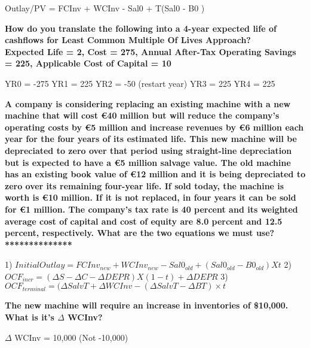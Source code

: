 \documentclass[12pt]{article}
\begin{document}
\begin{framed}
{			Outlay/PV = FCInv + WCInv - Sal0 + T(Sal0 - B0	)
			
			
			\textbf{How do you translate the following into a 4-year expected life of cashflows for Least Common Multiple Of Lives Approach?\\
				Expected Life = 2, Cost = 275, Annual After-Tax Operating Savings = 225, Applicable Cost of Capital = 10}
			
			YR0 = -275
			YR1 = 225
			YR2 = -50 (restart year)
			YR3 = 225
			YR4 = 225
			
			\textbf{A company is considering replacing an existing machine with a new machine that will cost €40 million but will reduce the company's operating costs by €5 million and increase revenues by €6 million each year for the four years of its estimated life. This new machine will be depreciated to zero over that period using straight-line depreciation but is expected to have a €5 million salvage value. The old machine has an existing book value of €12 million and it is being depreciated to zero over its remaining four-year life. If sold today, the machine is worth is €10 million. If it is not replaced, in four years it can be sold for €1 million. The company's tax rate is 40 percent and its weighted average cost of capital and cost of equity are 8.0 percent and 12.5 percent, respectively. What are the two equations we must use? **************}
			
			1) $Initial Outlay = FCInv_{new} + WCInv_{new} - Sal0_{old} + (Sal0_{old}  - B0_{old}) X t$
			2) $OCF_{incr} = (\Delta S -  \Delta C - \Delta DEPR) X (1 - t)  + \Delta DEPR$
			3) $OCF_{terminal} = (\Delta SalvT +  \Delta WCInv -(\Delta SalvT - \Delta BT) \times t$
			
			
			\textbf{ The new machine will require an increase in inventories of \$10,000. What is it's $\Delta$ WCInv?}
			
			$\Delta$  WCInv = 10,000 (Not -10,000)
			
			
}
\end{framed}
\end{document}
